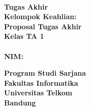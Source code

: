 {\centering
\large
{\bigsize\bf \Title}\\
\vspace{ 2cm}
\rm
\iflogTA
\textbf{Tugas Akhir}\\
\vspace{0.5 cm}
\textbf{Kelompok Keahlian: \KK}\\
\else
\textbf{Proposal Tugas Akhir}\\
\vspace{0.5 cm}
\textbf{Kelas TA 1}\\
\fi
\vspace{0.5 cm}
\textbf{\Author}\\ \textbf{NIM: \NIM}\\ 

\vspace{1.5 cm}

\begin{figure}[h]
{\par}
\end{figure}

\vspace{2 cm}
{\bigsize\textbf{Program Studi Sarjana \Prodi}\\
\vspace{0.5 cm}
\textbf{Fakultas Informatika}\\
\vspace{0.5 cm}
\textbf{Universitas Telkom}\\
\vspace{0.5 cm}
\textbf{Bandung}\\
\vspace{0.5 cm}
\textbf{\Date}\\}
}